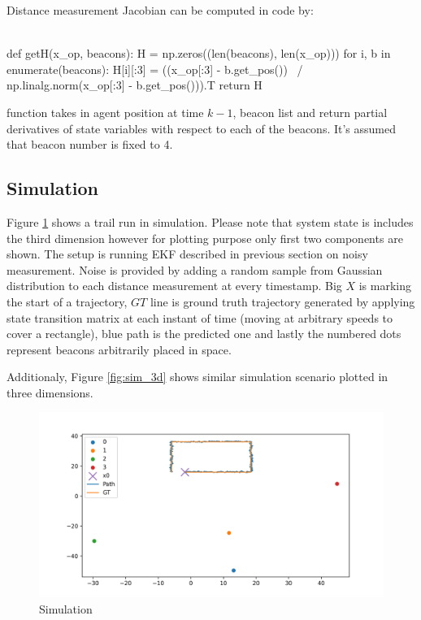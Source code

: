 Distance measurement Jacobian can be computed in code by:
\\
\\
\begin{minipage}{\linewidth}
    \begin{python}
    def getH(x_op, beacons):
        H = np.zeros((len(beacons), len(x_op)))
        for i, b in enumerate(beacons):
        H[i][:3] = ((x_op[:3] - b.get_pos()) \
            / np.linalg.norm(x_op[:3] - b.get_pos())).T
        return H
    \end{python}
\end{minipage}
function takes in agent position at time $k-1$, beacon list and return partial derivatives of state variables with respect to each of the beacons. It's assumed that beacon number is fixed to 4.

\subsection{Simulation}

Figure \ref{fig:sim} shows a trail run in simulation. Please note that system state is includes the third dimension however for plotting purpose only first two components are shown. The setup is running EKF described in previous section on noisy measurement. Noise is provided by adding a random sample from Gaussian distribution to each distance measurement at every timestamp. Big $X$ is marking the start of a trajectory, $GT$ line is ground truth trajectory generated by applying state transition matrix at each instant of time (moving at arbitrary speeds to cover a rectangle), blue path is the predicted one and lastly the numbered dots represent beacons arbitrarily placed in space.

Additionaly, Figure \ref{fig:sim_3d} shows similar simulation scenario plotted in three dimensions.

\begin{figure}[H]
    \centering
    \includegraphics[width=.75\linewidth]{figures/sim.png}
    \caption{Simulation}
    \label{fig:sim}
\end{figure}

